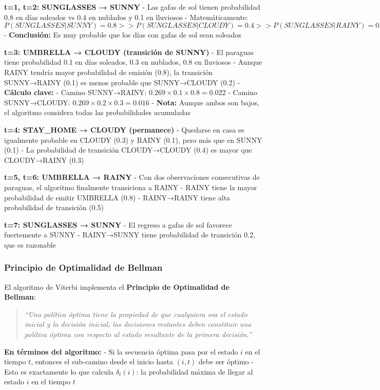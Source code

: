 \documentclass[
]{article}
\begin{document}
\textbf{t=1, t=2: SUNGLASSES → SUNNY} - Las gafas de sol tienen
probabilidad 0.8 en días soleados vs 0.4 en nublados y 0.1 en lluviosos
- Matemáticamente:
\(P(SUNGLASSES|SUNNY) = 0.8 >> P(SUNGLASSES|CLOUDY) = 0.4 >> P(SUNGLASSES|RAINY) = 0.1\)
- \textbf{Conclusión:} Es muy probable que los días con gafas de sol
sean soleados

\textbf{t=3: UMBRELLA → CLOUDY (transición de SUNNY)} - El paraguas
tiene probabilidad 0.1 en días soleados, 0.3 en nublados, 0.8 en
lluviosos - Aunque RAINY tendría mayor probabilidad de emisión (0.8), la
transición SUNNY→RAINY (0.1) es menos probable que SUNNY→CLOUDY (0.2) -
\textbf{Cálculo clave:} - Camino SUNNY→RAINY:
\(0.269 \times 0.1 \times 0.8 = 0.022\) - Camino SUNNY→CLOUDY:
\(0.269 \times 0.2 \times 0.3 = 0.016\) - \textbf{Nota:} Aunque ambos
son bajos, el algoritmo considera todas las probabilidades acumuladas

\textbf{t=4: STAY\_HOME → CLOUDY (permanece)} - Quedarse en casa es
igualmente probable en CLOUDY (0.3) y RAINY (0.1), pero más que en SUNNY
(0.1) - La probabilidad de transición CLOUDY→CLOUDY (0.4) es mayor que
CLOUDY→RAINY (0.3)

\textbf{t=5, t=6: UMBRELLA → RAINY} - Con dos observaciones consecutivas
de paraguas, el algoritmo finalmente transiciona a RAINY - RAINY tiene
la mayor probabilidad de emitir UMBRELLA (0.8) - RAINY→RAINY tiene alta
probabilidad de transición (0.5)

\textbf{t=7: SUNGLASSES → SUNNY} - El regreso a gafas de sol favorece
fuertemente a SUNNY - RAINY→SUNNY tiene probabilidad de transición 0.2,
que es razonable

\subsubsection{Principio de Optimalidad de
Bellman}\label{principio-de-optimalidad-de-bellman}

El algoritmo de Viterbi implementa el \textbf{Principio de Optimalidad
de Bellman}:

\begin{quote}
\emph{``Una política óptima tiene la propiedad de que cualquiera sea el
estado inicial y la decisión inicial, las decisiones restantes deben
constituir una política óptima con respecto al estado resultante de la
primera decisión.''}
\end{quote}

\textbf{En términos del algoritmo:} - Si la secuencia óptima pasa por el
estado \(i\) en el tiempo \(t\), entonces el sub-camino desde el inicio
hasta \((i,t)\) debe ser óptimo - Esto es exactamente lo que calcula
\(\delta_t(i)\): la probabilidad máxima de llegar al estado \(i\) en el
tiempo \(t\)
\end{document}
